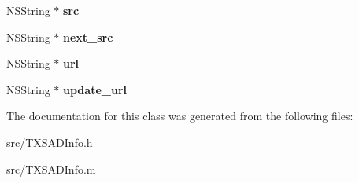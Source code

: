 \begin{DoxyCompactItemize}
\item 
\hypertarget{interface_t_x_s_a_d_info_aa1c0b18b99bb3219a58fc96b05f0bc0e}{}N\+S\+String $\ast$ {\bfseries src}\label{interface_t_x_s_a_d_info_aa1c0b18b99bb3219a58fc96b05f0bc0e}

\item 
\hypertarget{interface_t_x_s_a_d_info_ac59fac40093b329172ae1b26428ddcf4}{}N\+S\+String $\ast$ {\bfseries next\+\_\+src}\label{interface_t_x_s_a_d_info_ac59fac40093b329172ae1b26428ddcf4}

\item 
\hypertarget{interface_t_x_s_a_d_info_a54ab1f9988b3a87f0c82a7128d24a11c}{}N\+S\+String $\ast$ {\bfseries url}\label{interface_t_x_s_a_d_info_a54ab1f9988b3a87f0c82a7128d24a11c}

\item 
\hypertarget{interface_t_x_s_a_d_info_a7dfc7d896e3d5290607831fa29cf2f8a}{}N\+S\+String $\ast$ {\bfseries update\+\_\+url}\label{interface_t_x_s_a_d_info_a7dfc7d896e3d5290607831fa29cf2f8a}

\end{DoxyCompactItemize}


The documentation for this class was generated from the following files\+:\begin{DoxyCompactItemize}
\item 
src/T\+X\+S\+A\+D\+Info.\+h\item 
src/T\+X\+S\+A\+D\+Info.\+m\end{DoxyCompactItemize}

